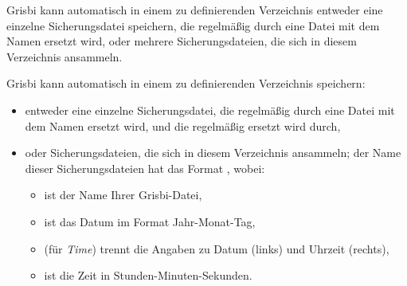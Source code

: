 Grisbi kann automatisch in einem zu definierenden Verzeichnis entweder eine einzelne Sicherungsdatei speichern, die regelmäßig durch eine Datei mit dem Namen  ersetzt wird, oder mehrere Sicherungsdateien, die sich in diesem Verzeichnis ansammeln.

Grisbi kann automatisch in einem zu definierenden Verzeichnis speichern:
\begin{itemize}
	\item entweder eine einzelne Sicherungsdatei, die regelmäßig durch eine Datei mit dem Namen  ersetzt wird, und die regelmäßig ersetzt wird durch,
	\item oder Sicherungsdateien, die sich in diesem Verzeichnis ansammeln; der Name dieser Sicherungsdateien hat das Format , wobei:
	\begin{itemize}
		\item {} ist der Name Ihrer Grisbi-Datei,
		\item {} ist das Datum im Format Jahr-Monat-Tag,
		\item {} (für \emph{Time}) trennt die Angaben zu Datum (links) und Uhrzeit (rechts),
		\item {} ist die Zeit in Stunden-Minuten-Sekunden.

\end{itemize}
\end{itemize}
